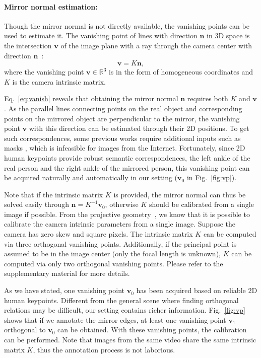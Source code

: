 \paragraph{Mirror normal estimation:}
Though the mirror normal is not directly available, the vanishing points can be used to estimate it. The vanishing point of lines with direction $\bm n$ in 3D space is the intersection $\bm v$ of the image plane with a ray through the camera center with direction $\bm n$~\cite{hartley2003multiple}:
\begin{equation}
\bm v=K \bm n,
\label{eq:vanish}
\end{equation}
where the vanishing point $\bm v\in \mathbb{R}^3$ is in the form of homogeneous coordinates and $K$ is the camera intrinsic matrix. 

Eq.~\ref{eq:vanish} reveals that obtaining the mirror normal $\bm n$ requires both $K$ and $\bm v$. As the parallel lines connecting points on the real object and corresponding points on the mirrored object are perpendicular to the mirror, the vanishing point $\bm v$ with this direction can be estimated through their 2D positions.
To get such correspondences, some previous works require additional inputs such as masks \cite{Hu2005MultipleView3R}, which is infeasible for images from the Internet.
Fortunately, since 2D human keypoints provide robust semantic correspondences, \eg the left ankle of the real person and the right ankle of the mirrored person, this vanishing point can be acquired naturally and automatically in our setting ($\bm v_0$ in Fig.~\ref{fig:vp}).

Note that if the intrinsic matrix $K$ is provided, the mirror normal can thus be solved easily through $\bm n=K^{-1} \bm v_0$, otherwise $K$ should be calibrated from a single image if possible. From the projective geometry~\cite{hartley2003multiple}, we know that it is possible to calibrate the camera intrinsic parameters from a single image. Suppose the camera has zero skew and square pixels. The intrinsic matrix $K$ can be computed via three orthogonal vanishing points. Additionally, if the principal point is assumed to be in the image center (only the focal length is unknown), $K$ can be computed via only two orthogonal vanishing points. Please refer to the supplementary material for more details. 

As we have stated, one vanishing point $\bm v_0$ has been acquired based on reliable 2D human keypoints. Different from the general scene where finding orthogonal relations may be difficult, our setting contains richer information. Fig.~\ref{fig:vp} shows that if we annotate the mirror edges, at least one vanishing point $\bm v_1$ orthogonal to $\bm v_0$ can be obtained. With these vanishing points, the calibration can be performed. Note that images from the same video share the same intrinsic matrix $K$, thus the annotation process is not laborious.

